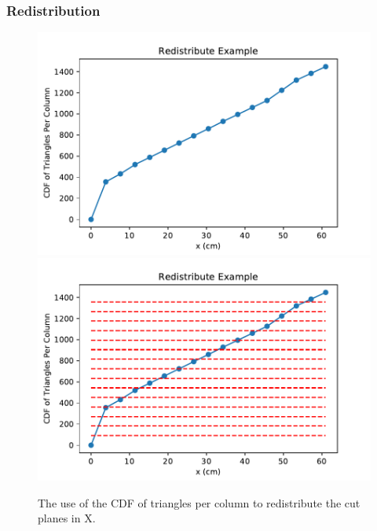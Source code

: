 \documentclass[xcolor={usenames,dvipsnames,svgnames,table}]{beamer}
\begin{document}
\begin{frame}[t]\frametitle{Redistribution}
\begin{figure}[H]
\centering
\includegraphics[scale=0.3]{figures/redistribute_before.pdf}
\includegraphics[scale=0.3]{figures/redistribute_after.pdf}
\caption{The use of the CDF of triangles per column to redistribute the cut planes in X.}
\label{redistribute}
\end{figure}
\end{frame}
\end{document}
